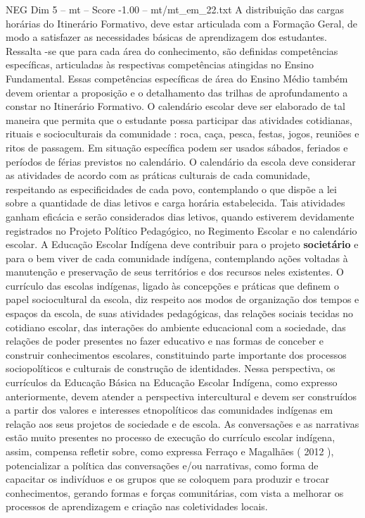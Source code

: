 \begin{textsample}{NEG Dim 5 – mt – Score -1.00 – mt/mt\_em\_22.txt}
A distribuição das cargas horárias do Itinerário Formativo, deve estar articulada com a Formação Geral, de modo a satisfazer as necessidades básicas de aprendizagem dos estudantes.
Ressalta -se que para cada área do conhecimento, são definidas competências específicas, articuladas às respectivas competências atingidas no Ensino Fundamental.
Essas competências específicas de área do Ensino Médio também devem orientar a proposição e o detalhamento das trilhas de aprofundamento a constar no Itinerário Formativo.
O calendário escolar deve ser elaborado de tal maneira que permita que o estudante possa participar das atividades cotidianas, rituais e socioculturais da comunidade : roca, caça, pesca, festas, jogos, reuniões e ritos de passagem.
Em situação específica podem ser usados sábados, feriados e períodos de férias previstos no calendário.
O calendário da escola deve considerar as atividades de acordo com as práticas culturais de cada comunidade, respeitando as especificidades de cada povo, contemplando o que dispõe a lei sobre a quantidade de dias letivos e carga horária estabelecida.
Tais atividades ganham eficácia e serão considerados dias letivos, quando estiverem devidamente registrados no Projeto Político Pedagógico, no Regimento Escolar e no calendário escolar.
A Educação Escolar Indígena deve contribuir para o projeto \textbf{societário} e para o bem viver de cada comunidade indígena, contemplando ações voltadas à manutenção e preservação de seus territórios e dos recursos neles existentes.
O currículo das escolas indígenas, ligado às concepções e práticas que definem o papel sociocultural da escola, diz respeito aos modos de organização dos tempos e espaços da escola, de suas atividades pedagógicas, das relações sociais tecidas no cotidiano escolar, das interações do ambiente educacional com a sociedade, das relações de poder presentes no fazer educativo e nas formas de conceber e construir conhecimentos escolares, constituindo parte importante dos processos sociopolíticos e culturais de construção de identidades.
Nessa perspectiva, os currículos da Educação Básica na Educação Escolar Indígena, como expresso anteriormente, devem atender a perspectiva intercultural e devem ser construídos a partir dos valores e interesses etnopolíticos das comunidades indígenas em relação aos seus projetos de sociedade e de escola.
As conversações e as narrativas estão muito presentes no processo de execução do currículo escolar indígena, assim, compensa refletir sobre, como expressa Ferraço e Magalhães ( 2012 ), potencializar a política das conversações e/ou narrativas, como forma de capacitar os indivíduos e os grupos que se coloquem para produzir e trocar conhecimentos, gerando formas e forças comunitárias, com vista a melhorar os processos de aprendizagem e criação nas coletividades locais.

\end{textsample}
